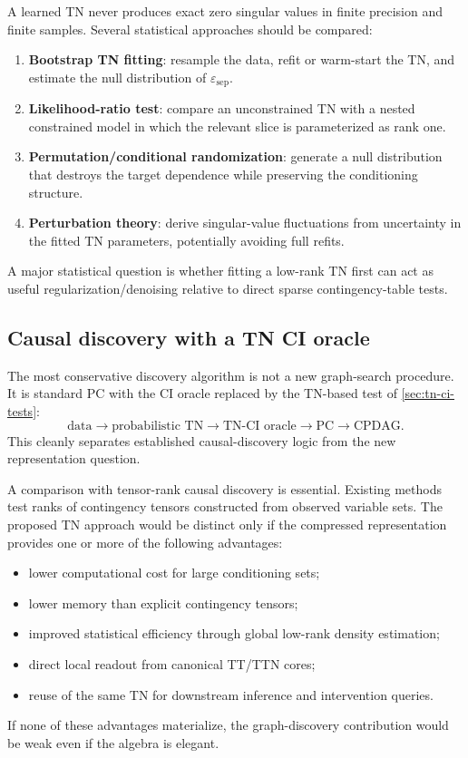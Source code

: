 \documentclass[11pt]{article}
\theoremstyle{remark}
\newcommand{\CPDAG}{\mathrm{CPDAG}}
\begin{document}
A learned TN never produces exact zero singular values in finite precision and finite samples. Several statistical approaches should be compared:
\begin{enumerate}
\item \textbf{Bootstrap TN fitting}: resample the data, refit or warm-start the TN, and estimate the null distribution of $\varepsilon_{\mathrm{sep}}$.
\item \textbf{Likelihood-ratio test}: compare an unconstrained TN with a nested constrained model in which the relevant slice is parameterized as rank one.
\item \textbf{Permutation/conditional randomization}: generate a null distribution that destroys the target dependence while preserving the conditioning structure.
\item \textbf{Perturbation theory}: derive singular-value fluctuations from uncertainty in the fitted TN parameters, potentially avoiding full refits.
\end{enumerate}
A major statistical question is whether fitting a low-rank TN first can act as useful regularization/denoising relative to direct sparse contingency-table tests.

\subsection{Causal discovery with a TN CI oracle}

The most conservative discovery algorithm is not a new graph-search procedure. It is standard PC with the CI oracle replaced by the TN-based test of \cref{sec:tn-ci-tests}:
\begin{equation}
\boxed{
\text{data}\to \text{probabilistic TN}\to \text{TN-CI oracle}\to \text{PC}\to\CPDAG.}
\end{equation}
This cleanly separates established causal-discovery logic from the new representation question.

A comparison with tensor-rank causal discovery \cite{chen2024tensor,chen2025latent} is essential. Existing methods test ranks of contingency tensors constructed from observed variable sets. The proposed TN approach would be distinct only if the compressed representation provides one or more of the following advantages:
\begin{itemize}
\item lower computational cost for large conditioning sets;
\item lower memory than explicit contingency tensors;
\item improved statistical efficiency through global low-rank density estimation;
\item direct local readout from canonical TT/TTN cores;
\item reuse of the same TN for downstream inference and intervention queries.
\end{itemize}
If none of these advantages materialize, the graph-discovery contribution would be weak even if the algebra is elegant.
\end{document}
